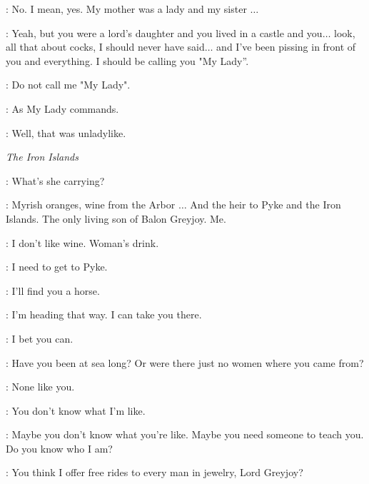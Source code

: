 \ARYA: No. I mean, yes. My mother was a lady and my sister $\ldots$

\GENDRY: Yeah, but you were a lord's daughter and you lived in a castle and you$\ldots$ look, all that about cocks, I should never have said$\ldots$ and I've been pissing in front of you and everything.  I should be calling you "My Lady''.

\ARYA: Do not call me "My Lady".

\GENDRY: As My Lady commands.


\GENDRY: Well, that was unladylike.



\scene

\textit{The Iron Islands}


\OLDMAN: What's she carrying?

\THEON: Myrish oranges, wine from the Arbor $\ldots$ And the heir to Pyke and the Iron Islands.  The only living son of Balon Greyjoy.  Me.

\OLDMAN: I don't like wine. Woman's drink.

\THEON: I need to get to Pyke.


\OLDMAN: I'll find you a horse.


\YARA: I'm heading that way. I can take you there.

\THEON: I bet you can.

\YARA: Have you been at sea long? Or were there just no women where you came from?

\THEON: None like you.

\YARA: You don't know what I'm like.

\THEON: Maybe you don't know what you're like. Maybe you need someone to teach you. Do you know who I am?

\YARA: You think I offer free rides to every man in jewelry, Lord Greyjoy?

